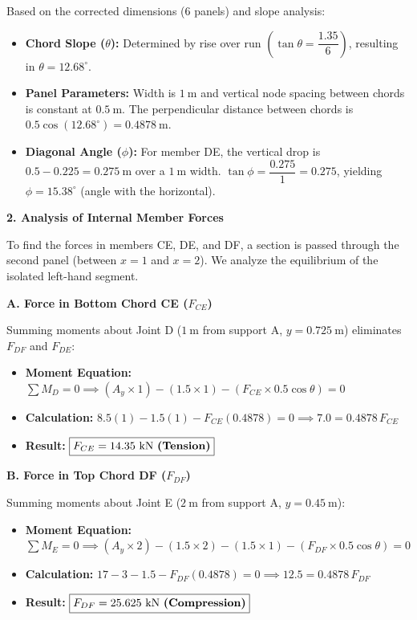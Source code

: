 \documentclass[12pt,a3paper]{article}
\begin{document}
\begin{enumerate}
\begin{tcolorbox}[enhanced,breakable,ansbox,colback=cE!4,colframe=cE,
  boxrule=0.8pt,arc=5pt,
  title={\textbf{Answer}},fonttitle=\bfseries\color{white},colbacktitle=cE]
Based on the corrected dimensions (6 panels) and slope analysis:
\begin{itemize}[leftmargin=1.5em,itemsep=2pt]
  \item \textbf{Chord Slope ($\theta$):} Determined by rise over run $\left(\tan\theta = \dfrac{1.35}{6}\right)$, resulting in $\theta = 12.68^\circ$.
  \item \textbf{Panel Parameters:} Width is $1\ \text{m}$ and vertical node spacing between chords is constant at $0.5\ \text{m}$. The perpendicular distance between chords is $0.5 \cos(12.68^\circ) = 0.4878\ \text{m}$.
  \item \textbf{Diagonal Angle ($\phi$):} For member DE, the vertical drop is $0.5 - 0.225 = 0.275\ \text{m}$ over a $1\ \text{m}$ width. $\tan\phi = \dfrac{0.275}{1} = 0.275$, yielding $\phi = 15.38^\circ$ (angle with the horizontal).
\end{itemize}

\textbf{2. Analysis of Internal Member Forces}

To find the forces in members CE, DE, and DF, a section is passed through the second panel (between $x=1$ and $x=2$). We analyze the equilibrium of the isolated left-hand segment.

\textbf{A. Force in Bottom Chord CE ($F_{CE}$)}

Summing moments about Joint D ($1\ \text{m}$ from support A, $y = 0.725\ \text{m}$) eliminates $F_{DF}$ and $F_{DE}$:
\begin{itemize}[leftmargin=1.5em,itemsep=2pt]
  \item \textbf{Moment Equation:} 
    $\displaystyle\sum M_D = 0 \implies (A_y \times 1) - (1.5 \times 1) - (F_{CE} \times 0.5\cos\theta) = 0$
  \item \textbf{Calculation:} $8.5(1) - 1.5(1) - F_{CE}(0.4878) = 0 \implies 7.0 = 0.4878\, F_{CE}$
  \item \textbf{Result:} $\boxed{F_{CE} = 14.35\ \text{kN \textbf{(Tension)}}}$
\end{itemize}

\textbf{B. Force in Top Chord DF ($F_{DF}$)}

Summing moments about Joint E ($2\ \text{m}$ from support A, $y = 0.45\ \text{m}$):
\begin{itemize}[leftmargin=1.5em,itemsep=2pt]
  \item \textbf{Moment Equation:} 
    $\displaystyle\sum M_E = 0 \implies (A_y \times 2) - (1.5 \times 2) - (1.5 \times 1) - (F_{DF} \times 0.5\cos\theta) = 0$
  \item \textbf{Calculation:} $17 - 3 - 1.5 - F_{DF}(0.4878) = 0 \implies 12.5 = 0.4878\, F_{DF}$
  \item \textbf{Result:} $\boxed{F_{DF} = 25.625\ \text{kN \textbf{(Compression)}}}$
\end{itemize}


\end{tcolorbox}
\end{enumerate}
\end{document}
